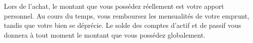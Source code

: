 Lors de l'achat, le montant que vous possédez réellement est votre apport personnel. Au cours du temps, vous remboursez les mensualités de votre emprunt, tandis que votre bien se déprécie. Le solde des comptes d'actif et de passif vous donnera à tout moment le montant que vous possédez globalement.








